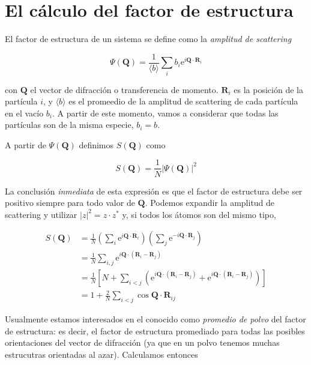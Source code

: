 \section{El cálculo del factor de estructura}

El factor de estructura de un sistema se define como la \emph{amplitud de scattering}~\cite{egami_underneath_2003}

\begin{equation}
  \Psi(\mathbf{Q}) = \frac{1}{\langle b\rangle} \sum_i b_i
  \text{e}^{i\mathbf{Q}\cdot\mathbf{R}_i}
  \label{eq:scat_amp}
\end{equation}

con $\mathbf{Q}$ el vector de difracción o transferencia de momento.
$\mathbf{R}_i$ es la posición de la partícula $i$, y $\langle b\rangle$ es el promeedio de la amplitud de scattering de cada partícula en el vacío $b_i$.
A partir de este momento, vamos a considerar que todas las partículas son de la misma especie, $b_i = b$.

A partir de $\Psi(\mathbf{Q})$ definimos $S(\mathbf{Q})$ como

\begin{equation*}
  S(\mathbf{Q}) = \frac{1}{N} |\Psi(\mathbf{Q})|^2
\end{equation*}

La conclusión \emph{inmediata} de esta expresión es que el factor de estructura debe ser positivo siempre para todo valor de $\mathbf{Q}$.
Podemos expandir la amplitud de scattering y utilizar $|z|^2 = z\cdot z^*$  y, si todos los átomos son del mismo tipo,


\begin{align*}
  S(\mathbf{Q}) &= \frac{1}{N} \left( \sum_i \text{e}^{i\mathbf{Q}\cdot\mathbf{R}_i} \right)
  \left( \sum_j \text{e}^{-i\mathbf{Q}\cdot\mathbf{R}_j} \right)\\
  &= \frac{1}{N} \sum_{i, j} \text{e}^{i\mathbf{Q}\cdot(\mathbf{R}_i-\mathbf{R}_j)}\\
  &= \frac{1}{N} \left[N + \sum_{i < j}
    \left(\text{e}^{i\mathbf{Q}\cdot(\mathbf{R}_i-\mathbf{R}_j)} +
      \text{e}^{i\mathbf{Q}\cdot(\mathbf{R}_i-\mathbf{R}_j)}\right)\right]\\
  &= 1 + \frac{2}{N}\sum_{i < j}\cos{\mathbf{Q}\cdot\mathbf{R}_{ij}}
\end{align*}

Usualmente estamos interesados en el conocido como \emph{promedio de polvo} del factor de estructura: es decir, el factor de estructura promediado para todas las posibles orientaciones del vector de difracción (ya que en un polvo tenemos muchas estrucutras orientadas al azar).
Calculamos entonces

